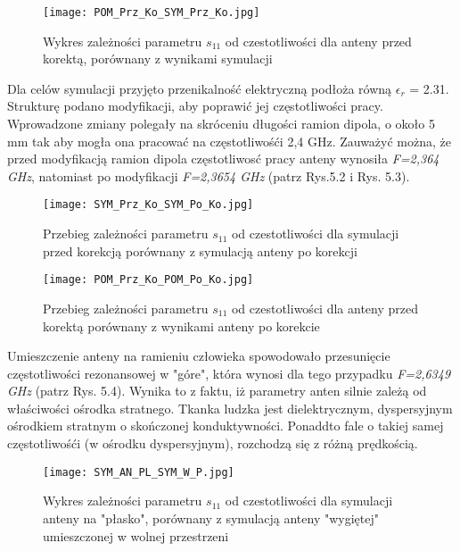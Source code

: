 \begin{figure}[h!]
\centering
	\texttt{[image: POM\_Prz\_Ko\_SYM\_Prz\_Ko.jpg]}
	\caption{Wykres zależności parametru $s_{11}$ od czestotliwości dla anteny przed korektą, porównany z wynikami symulacji}
\end{figure}


\newpage
\noindent
\newline Dla celów symulacji przyjęto przenikalność elektryczną podłoża równą $\epsilon_{r}$ = 2.31. Strukturę podano modyfikacji, aby poprawić jej częstotliwości pracy. Wprowadzone zmiany polegały na skróceniu długości ramion dipola, o około 5 mm tak aby mogła ona pracować na częstotliwośći 2,4 GHz. Zauważyć można, że przed modyfikacją ramion dipola częstotliwosć pracy anteny wynosiła \emph{F=2,364 GHz}, natomiast po modyfikacji \emph{F=2,3654 GHz} (patrz Rys.5.2 i Rys. 5.3).  

\begin{figure}[H]
\centering
	\texttt{[image: SYM\_Prz\_Ko\_SYM\_Po\_Ko.jpg]}
	\caption{Przebieg zależności parametru $s_{11}$ od czestotliwości dla symulacji przed korekcją porównany z symulacją anteny po korekcji}
\end{figure}

\newpage
\begin{figure}[H]
\centering
	\texttt{[image: POM\_Prz\_Ko\_POM\_Po\_Ko.jpg]}
	\caption{Przebieg zależności parametru $s_{11}$ od czestotliwości dla anteny przed korektą porównany z wynikami anteny po korekcie}
\end{figure}


\newpage
\noindent
\newline Umieszczenie anteny na ramieniu człowieka spowodowało przesunięcie częstotliwości rezonansowej w "góre", która wynosi dla tego przypadku \emph{F=2,6349 GHz} (patrz Rys. 5.4). Wynika to z faktu, iż parametry anten silnie zależą od właściwości ośrodka stratnego.  
Tkanka ludzka jest dielektrycznym, dyspersyjnym ośrodkiem stratnym o skończonej konduktywności. Ponaddto fale o takiej samej częstotliwośći (w ośrodku dyspersyjnym), rozchodzą się z różną prędkością. 




\begin{figure}[H]
\centering
	\texttt{[image: SYM\_AN\_PL\_SYM\_W\_P.jpg]}
	\caption{Wykres zależności parametru $s_{11}$ od czestotliwości dla symulacji anteny na "płasko", porównany z symulacją anteny "wygiętej" umieszczonej w wolnej przestrzeni}
\end{figure}


